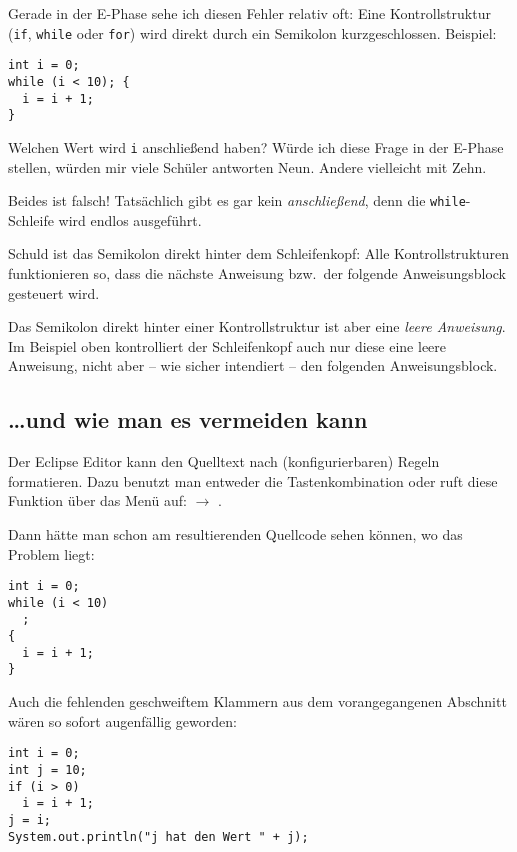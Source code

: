 Gerade in der E-Phase sehe ich diesen Fehler relativ oft: Eine Kontrollstruktur
(\lstinline|if|, \lstinline|while| oder \lstinline|for|) wird direkt durch ein
Semikolon \glqq kurzgeschlossen\grqq . Beispiel:

\begin{lstlisting}
int i = 0;
while (i < 10); {
  i = i + 1;
}
\end{lstlisting}

Welchen Wert wird \lstinline|i| anschließend haben? Würde ich diese Frage in der
E-Phase stellen, würden mir viele Schüler antworten \glqq Neun\grqq. Andere
vielleicht mit \glqq Zehn\grqq .

Beides ist falsch! Tatsächlich gibt es gar kein \emph{anschließend}, denn die
\lstinline|while|-Schleife wird endlos ausgeführt.

Schuld ist das Semikolon direkt hinter dem Schleifenkopf: Alle
Kontrollstrukturen funktionieren so, dass die nächste Anweisung bzw.\
der folgende Anweisungsblock gesteuert wird.

Das Semikolon direkt hinter einer Kontrollstruktur ist aber eine \emph{leere
Anweisung}. Im Beispiel oben kontrolliert der Schleifenkopf auch nur diese
eine leere Anweisung, nicht aber -- wie sicher intendiert -- den folgenden
Anweisungsblock.

\subsection{\ldots und wie man es vermeiden kann}

Der Eclipse Editor kann den Quelltext nach (konfigurierbaren) Regeln
formatieren. Dazu benutzt man entweder die Tastenkombination
 oder ruft diese Funktion über das Menü auf:
\myPMI{Source} $\rightarrow$ \myPMI{Format}.

Dann hätte man schon am resultierenden Quellcode sehen können, wo das Problem
liegt:

\begin{lstlisting}
int i = 0;
while (i < 10)
  ; 
{
  i = i + 1;
}
\end{lstlisting}

Auch die fehlenden geschweiftem Klammern aus dem vorangegangenen Abschnitt wären
so sofort augenfällig geworden:

\begin{lstlisting}
int i = 0;
int j = 10;
if (i > 0)
  i = i + 1;
j = i;
System.out.println("j hat den Wert " + j);
\end{lstlisting}